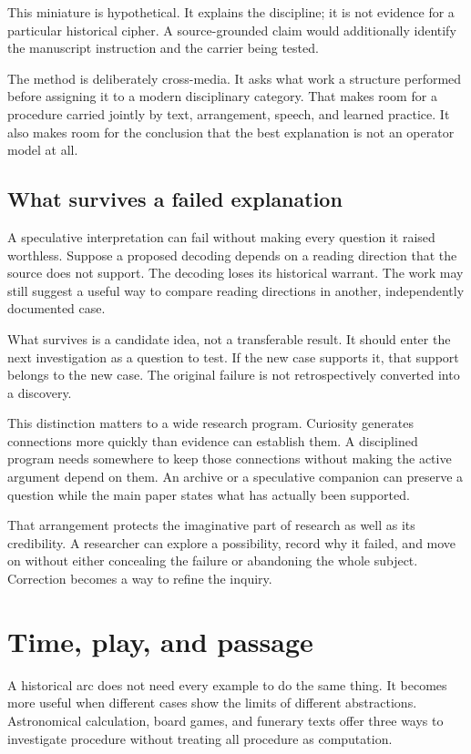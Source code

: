 \documentclass[11pt]{article}
\begin{document}
This miniature is hypothetical. It explains the discipline; it is not evidence
for a particular historical cipher. A source-grounded claim would additionally
identify the manuscript instruction and the carrier being tested.

The method is deliberately cross-media. It asks what work a structure performed
before assigning it to a modern disciplinary category. That makes room for a
procedure carried jointly by text, arrangement, speech, and learned practice.
It also makes room for the conclusion that the best explanation is not an
operator model at all.

\subsection{What survives a failed explanation}

A speculative interpretation can fail without making every question it raised
worthless. Suppose a proposed decoding depends on a reading direction that the
source does not support. The decoding loses its historical warrant. The work
may still suggest a useful way to compare reading directions in another,
independently documented case.

What survives is a candidate idea, not a transferable result. It should enter
the next investigation as a question to test. If the new case supports it,
that support belongs to the new case. The original failure is not retrospectively
converted into a discovery.

This distinction matters to a wide research program. Curiosity generates
connections more quickly than evidence can establish them. A disciplined
program needs somewhere to keep those connections without making the active
argument depend on them. An archive or a speculative companion can preserve
a question while the main paper states what has actually been supported.

That arrangement protects the imaginative part of research as well as its
credibility. A researcher can explore a possibility, record why it failed,
and move on without either concealing the failure or abandoning the whole
subject. Correction becomes a way to refine the inquiry.

\section{Time, play, and passage}

A historical arc does not need every example to do the same thing. It becomes
more useful when different cases show the limits of different abstractions.
Astronomical calculation, board games, and funerary texts offer three ways
to investigate procedure without treating all procedure as computation.
\end{document}

